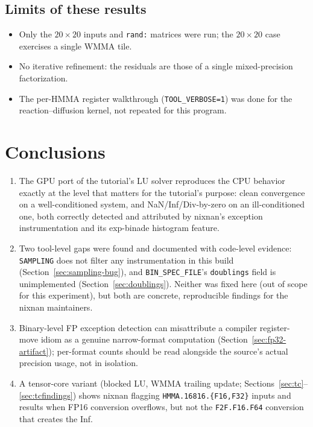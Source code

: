 \documentclass[11pt,a4paper]{article}
\begin{document}
\subsection{Limits of these results}

\begin{itemize}
  \item Only the $20\times20$ inputs and \texttt{rand:} matrices were run; the
    $20\times20$ case exercises a single WMMA tile.
  \item No iterative refinement: the residuals are those of a single
    mixed-precision factorization.
  \item The per-HMMA register walkthrough (\texttt{TOOL\_VERBOSE=1}) was done
    for the reaction--diffusion kernel, not repeated for this program.
\end{itemize}

\section{Conclusions}

\begin{enumerate}
  \item The GPU port of the tutorial's LU solver reproduces the CPU
    behavior exactly at the level that matters for the tutorial's purpose:
    clean convergence on a well-conditioned system, and NaN/Inf/Div-by-zero
    on an ill-conditioned one, both correctly detected and attributed by
    nixnan's exception instrumentation and its exp-binade histogram
    feature.
  \item Two tool-level gaps were found and documented with code-level
    evidence: \texttt{SAMPLING} does not filter any instrumentation in this
    build (Section~\ref{sec:sampling-bug}), and \texttt{BIN\_SPEC\_FILE}'s
    \texttt{doublings} field is unimplemented (Section~\ref{sec:doublings}).
    Neither was fixed here (out of scope for this experiment), but both are
    concrete, reproducible findings for the nixnan maintainers.
  \item Binary-level FP exception detection can misattribute a compiler
    register-move idiom as a genuine narrow-format computation
    (Section~\ref{sec:fp32-artifact}); per-format counts should be read
    alongside the source's actual precision usage, not in isolation.
  \item A tensor-core variant (blocked LU, WMMA trailing update;
    Sections~\ref{sec:tc}--\ref{sec:tcfindings}) shows nixnan flagging
    \texttt{HMMA.16816.\{F16,F32\}} inputs and results when FP16
    conversion overflows, but not the \texttt{F2F.F16.F64} conversion that
    creates the Inf.
\end{enumerate}
\end{document}
